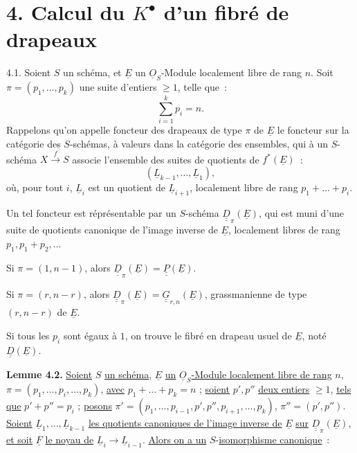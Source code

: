 
\section*{4. Calcul du \(K^{\bullet}\) d'un fibré de drapeaux}

4.1.
Soient \(S\) un schéma, et \(\underline{E}\) un \(\underline{O}_S\)-Module localement libre de rang \(n\). Soit \(\pi=(p_1,\ldots,p_k)\) une suite d'entiers \(\geq1\), telle que~:
\[
  \sum_{i=1}^k p_i=n.
\]
Rappelons qu'on appelle foncteur des drapeaux de type \(\pi\) de \(\underline{E}\) le foncteur sur la catégorie des \(S\)-schémas, à valeurs dans la catégorie des ensembles, qui à un \(S\)-schéma \(X\xrightarrow{f} S\) associe l'ensemble des suites de quotients de \(f^*(\underline{E})\)~:
\[
  (\underline{L}_{k-1},\ldots,\underline{L}_1),
\]
où, pour tout \(i\), \(\underline{L}_i\) est un quotient de \(\underline{L}_{i+1}\), localement libre de rang \(p_1+\ldots+p_i\).

Un tel foncteur est réprésentable par un \(S\)-schéma \(\underline{\underline{D}}_\pi(\underline{E})\), qui est muni d'une suite de quotients canonique de l'image inverse de \(\underline{E}\), localement libres de rang \(p_1,p_1+p_2,\ldots\)

Si \(\pi=(1,n-1)\), alors \(\underline{\underline{D}}_\pi(\underline{E})=\underline{\underline{P}}(\underline{E})\).

Si \(\pi=(r,n-r)\), alors \(\underline{\underline{D}}_\pi(\underline{E})=\underline{\underline{G}}_{r,n}(\underline{E})\), grassmanienne de type \((r,n-r)\) de \(\underline{E}\).

Si tous les \(p_i\) sont égaux à \(1\), on trouve le fibré en drapeau usuel de \(\underline{E}\), noté \(\underline{\underline{D}}(\underline{E})\).

\textbf{Lemme 4.2.} \uline{Soient} \(S\) \uline{un schéma}, \(\underline{E}\) \uline{un} \(\underline{O}_S\)\uline{-Module localement libre de rang} \(n\), \(\pi=(p_1,\ldots,p_i,\ldots,p_k)\), \uline{avec} \(p_1+\ldots+p_k=n\) ; \uline{soient} \(p',p''\) \uline{deux entiers} \(\geq1\), \uline{tels que} \(p'+p''=p_i\) ; \uline{posons} \(\pi'=(p_1,\ldots,p_{i-1},p',p'',p_{i+1},\ldots,p_k)\), \(\pi''=(p',p'')\). \uline{Soient} \(\underline{L}_1,\ldots,\underline{L}_{k-1}\) \uline{les quotients canoniques de l'image inverse de} \(\underline{E}\) \uline{sur} \(\underline{\underline{D}}_\pi(\underline{E})\), \uline{et soit} \(\underline{F}\) \uline{le noyau de} \(\underline{L}_i\to \underline{L}_{i-1}\). \uline{Alors on a un} \(S\)-\uline{isomorphisme canonique}~:
